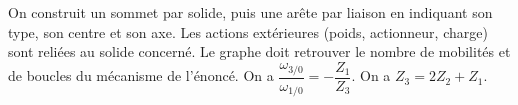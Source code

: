 \begin{corrigebox}
On construit un sommet par solide, puis une arête par liaison en
        indiquant son type, son centre et son axe. Les actions extérieures (poids,
        actionneur, charge) sont reliées au solide concerné. Le graphe doit retrouver le
        nombre de mobilités et de boucles du mécanisme de l'énoncé.
On a $\dfrac{\omega_{3/0}}{\omega_{1/0}}=-\dfrac{Z_1}{Z_3}$.
On a $Z_3 = 2Z_2 + Z_1$.
\end{corrigebox}
